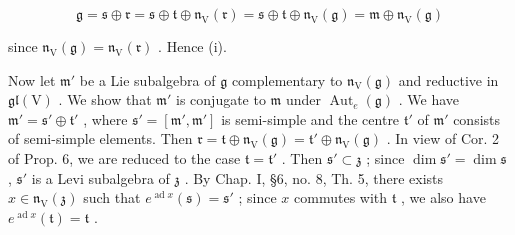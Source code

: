 \[
\mathfrak {g} = \mathfrak {s} \oplus \mathfrak {r} = \mathfrak {s} \oplus \mathfrak {t} \oplus \mathfrak {n} _ {\mathrm{V}} (\mathfrak {r}) = \mathfrak {s} \oplus \mathfrak {t} \oplus \mathfrak {n} _ {\mathrm{V}} (\mathfrak {g}) = \mathfrak {m} \oplus \mathfrak {n} _ {\mathrm{V}} (\mathfrak {g})
\]

since \(\mathfrak{n}_{\mathrm{V}}(\mathfrak{g}) = \mathfrak{n}_{\mathrm{V}}(\mathfrak{r})\) . Hence (i).

Now let \(\mathfrak{m}'\) be a Lie subalgebra of \(\mathfrak{g}\) complementary to \(\mathfrak{n}_{\mathrm{V}}(\mathfrak{g})\) and reductive in \(\mathfrak{gl}(\mathrm{V})\) . We show that \(\mathfrak{m}'\) is conjugate to \(\mathfrak{m}\) under \(\operatorname{Aut}_e(\mathfrak{g})\) . We have \(\mathfrak{m}' = \mathfrak{s}' \oplus \mathfrak{t}'\) , where \(\mathfrak{s}' = [\mathfrak{m}', \mathfrak{m}']\) is semi-simple and the centre \(\mathfrak{t}'\) of \(\mathfrak{m}'\) consists of semi-simple elements. Then \(\mathfrak{r} = \mathfrak{t} \oplus \mathfrak{n}_{\mathrm{V}}(\mathfrak{g}) = \mathfrak{t}' \oplus \mathfrak{n}_{\mathrm{V}}(\mathfrak{g})\) . In view of Cor. 2 of Prop. 6, we are reduced to the case \(\mathfrak{t} = \mathfrak{t}'\) . Then \(\mathfrak{s}' \subset \mathfrak{z}\) ; since \(\dim \mathfrak{s}' = \dim \mathfrak{s}\) , \(\mathfrak{s}'\) is a Levi subalgebra of \(\mathfrak{z}\) . By Chap. I, §6, no. 8, Th. 5, there exists \(x \in \mathfrak{n}_{\mathrm{V}}(\mathfrak{z})\) such that \(e^{\operatorname{ad} x}(\mathfrak{s}) = \mathfrak{s}'\) ; since \(x\) commutes with \(\mathfrak{t}\) , we also have \(e^{\operatorname{ad} x}(\mathfrak{t}) = \mathfrak{t}\) .

